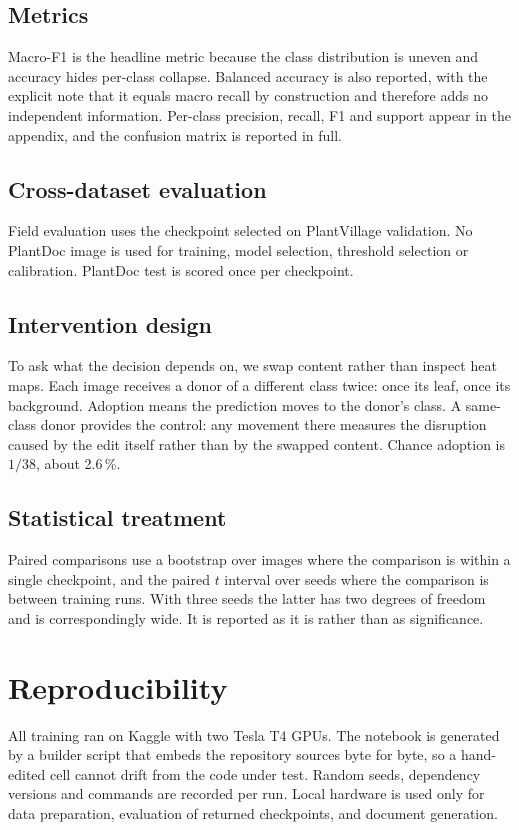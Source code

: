 \subsection{Metrics}

Macro-F1 is the headline metric because the class distribution is uneven and
accuracy hides per-class collapse. Balanced accuracy is also reported, with the
explicit note that it equals macro recall by construction and therefore adds no
independent information. Per-class precision, recall, F1 and support appear in the
appendix, and the confusion matrix is reported in full.

\subsection{Cross-dataset evaluation}

Field evaluation uses the checkpoint selected on PlantVillage validation. No
PlantDoc image is used for training, model selection, threshold selection or
calibration. PlantDoc test is scored once per checkpoint.

\subsection{Intervention design}

To ask what the decision depends on, we swap content rather than inspect heat maps.
Each image receives a donor of a different class twice: once its leaf, once its
background. Adoption means the prediction moves to the donor's class. A same-class
donor provides the control: any movement there measures the disruption caused by the
edit itself rather than by the swapped content. Chance adoption is $1/38$, about
2.6\,\%.

\subsection{Statistical treatment}

Paired comparisons use a bootstrap over images where the comparison is within a
single checkpoint, and the paired $t$ interval over seeds where the comparison is
between training runs. With three seeds the latter has two degrees of freedom and is
correspondingly wide. It is reported as it is rather than as significance.

\section{Reproducibility}

All training ran on Kaggle with two Tesla T4 GPUs. The notebook is generated by a
builder script that embeds the repository sources byte for byte, so a hand-edited
cell cannot drift from the code under test. Random seeds, dependency versions and
commands are recorded per run. Local hardware is used only for data preparation,
evaluation of returned checkpoints, and document generation.
